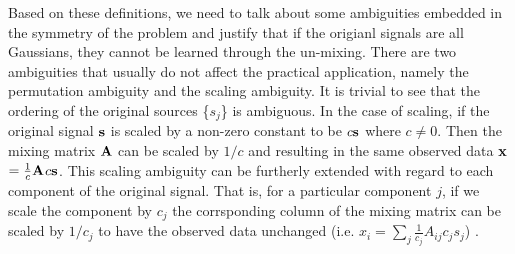 \documentclass[aps,prl,preprint,superscriptaddress]{revtex4-2}
\begin{document}
Based on these definitions, we need to talk about some ambiguities embedded in the symmetry of the problem and justify that if the origianl signals are all Gaussians, they cannot be learned through the un-mixing. There are two ambiguities that usually do not affect the practical application, namely the permutation ambiguity and the scaling ambiguity. It is trivial to see that the ordering of the original sources \{$s_{j}$\} is ambiguous. In the case of scaling, if the original signal $\bf{s}$ is scaled by a non-zero constant to be $c\bf{s}$ where $c \neq 0$. Then the mixing matrix $\bf{A}$ can be scaled by $1/c$ and resulting in the same observed data $\bf{x}$$ = \frac{1}{c}\bf{A}$$c\bf{s}$. This scaling ambiguity can be furtherly extended with regard to each component of the original signal. That is, for a particular component $j$, if we scale the component by $c_{j}$ the corrsponding column of the mixing matrix can be scaled by $1/c_{j}$ to have the observed data unchanged (i.e. $x_{i} = \sum_{j}\frac{1}{c_{j}}A_{ij}c_{j}s_{j}$) \cite{ng_cs229}.  
\end{document}
